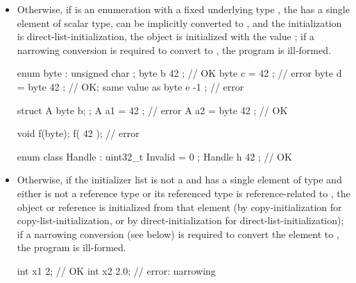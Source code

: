 \begin{itemize}
\begin{example}
\begin{codeblock}
struct S {
  // no initializer-list constructors
  S(int, double, double);           // \#1
  S();                              // \#2
  // ...
};
S s1 = { 1, 2, 3.0 };               // OK, invoke \#1
S s2 { 1.0, 2, 3 };                 // error: narrowing
S s3 { };                           // OK, invoke \#2
\end{codeblock}
\end{example}

\item Otherwise, if  is an enumeration
with a fixed underlying type ,
the  has a single element  of scalar type,
 can be implicitly converted to , and
the initialization is direct-list-initialization,
the object is initialized with the value ;
if a narrowing conversion is required to convert 
to , the program is ill-formed.
\begin{example}
\begin{codeblock}
enum byte : unsigned char { };
byte b { 42 };                      // OK
byte c = { 42 };                    // error
byte d = byte{ 42 };                // OK; same value as 
byte e { -1 };                      // error

struct A { byte b; };
A a1 = { { 42 } };                  // error
A a2 = { byte{ 42 } };              // OK

void f(byte);
f({ 42 });                          // error

enum class Handle : uint32_t { Invalid = 0 };
Handle h { 42 };                    // OK
\end{codeblock}
\end{example}

\item Otherwise, if
the initializer list
is not a  and
has a single element of type  and either
 is not a reference type or its referenced type is
reference-related to , the object or reference is initialized
from that element (by copy-initialization for copy-list-initialization,
or by direct-initialization for direct-list-initialization);
if a narrowing conversion (see below) is required
to convert the element to , the program is ill-formed.

\begin{example}
\begin{codeblock}
int x1 {2};                         // OK
int x2 {2.0};                       // error: narrowing
\end{codeblock}
\end{example}


\end{itemize}
